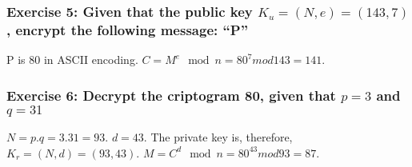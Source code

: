\documentclass[12pt,a4paper]{article}
\begin{document}
{\subsubsection*{Exercise 5: Given that the public key $K_u = (N,e) = (143, 7)$, encrypt the following message: ``P''}
P is 80 in ASCII encoding.
$C = M^e \mod n = 80^7 mod 143 = 141$.

\subsubsection*{Exercise 6: Decrypt the criptogram 80, given that $p = 3$ and $q = 31$ }
$N = p.q = 3.31 = 93$.
$d = 43$.
The private key is, therefore, $K_r = (N,d) = (93,43)$.
$M = C^d \mod n = 80^43 mod 93 = 87$.

}



\end{document}
